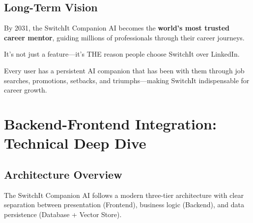 \documentclass[12pt,a4paper]{article}
\begin{document}
\subsection{Long-Term Vision}

\begin{tcolorbox}[colback=switchitpurple!5,colframe=switchitpurple,title=\textbf{5-Year Vision}]
By 2031, the SwitchIt Companion AI becomes the \textbf{world's most trusted career mentor}, guiding millions of professionals through their career journeys. 

\vspace{0.3cm}

It's not just a feature—it's THE reason people choose SwitchIt over LinkedIn.

\vspace{0.3cm}

Every user has a persistent AI companion that has been with them through job searches, promotions, setbacks, and triumphs—making SwitchIt indispensable for career growth.
\end{tcolorbox}

\section{Backend-Frontend Integration: Technical Deep Dive}

\subsection{Architecture Overview}

The SwitchIt Companion AI follows a modern three-tier architecture with clear separation between presentation (Frontend), business logic (Backend), and data persistence (Database + Vector Store).
\end{document}
